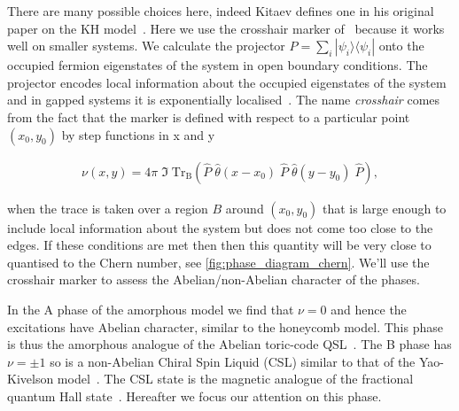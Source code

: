 There are many possible choices here, indeed Kitaev defines one in his original paper on the KH model~\autocite{kitaevAnyonsExactlySolved2006}. Here we use the crosshair marker of~\autocite{peru_preprint} because it works well on smaller systems. We calculate the projector \(P = \sum_i |\psi_i\rangle \langle \psi_i|\) onto the occupied fermion eigenstates of the system in open boundary conditions. The projector encodes local information about the occupied eigenstates of the system and in gapped systems it is exponentially localised~\autocite{hastingsLiebSchultzMattisHigherDimensions2004}. The name \emph{crosshair} comes from the fact that the marker is defined with respect to a particular point \((x_0, y_0)\) by step functions in x and y

\[\begin{aligned}
    \nu (x, y) = 4\pi \; \Im\; \mathrm{Tr}_{\mathrm{B}} 
    \left ( 
    \hat{P}\;\hat{\theta}(x-x_0)\;\hat{P}\;\hat{\theta}(y-y_0)\; \hat{P}
    \right ),
\end{aligned}\]

when the trace is taken over a region \(B\) around \((x_0, y_0)\) that is large enough to include local information about the system but does not come too close to the edges. If these conditions are met then then this quantity will be very close to quantised to the Chern number, see \cref{fig:phase_diagram_chern}. We'll use the crosshair marker to assess the Abelian/non-Abelian character of the phases.

In the A phase of the amorphous model we find that \(\nu=0\) and hence the excitations have Abelian character, similar to the honeycomb model. This phase is thus the amorphous analogue of the Abelian toric-code QSL~\autocite{kitaev_fault-tolerant_2003}. The B phase has \(\nu=\pm1\) so is a non-Abelian Chiral Spin Liquid (CSL) similar to that of the Yao-Kivelson model~\autocite{yaoExactChiralSpin2007}. The CSL state is the magnetic analogue of the fractional quantum Hall state~\autocite{laughlinPropertiesChiralspinliquidState1990}. Hereafter we focus our attention on this phase.

